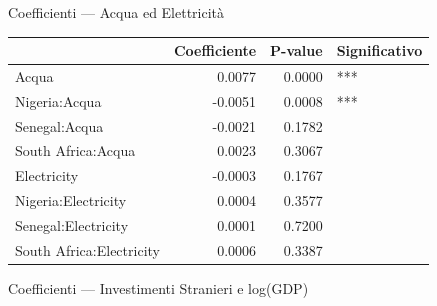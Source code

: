 \documentclass[
  ignorenonframetext,
  aspectratio=43,
]{beamer}
\begin{document}
\begin{frame}{Coefficienti --- Acqua ed Elettricità}
\protect{}\label{coefficienti-acqua-ed-elettricituxe0}
\begin{tabular}{lrrl}
\toprule
  & Coefficiente & P-value & Significativo\\
\midrule
Acqua & 0.0077 & 0.0000 & ***\\
Nigeria:Acqua & -0.0051 & 0.0008 & ***\\
Senegal:Acqua & -0.0021 & 0.1782 & \\
South Africa:Acqua & 0.0023 & 0.3067 & \\
Electricity & -0.0003 & 0.1767 & \\
\addlinespace
Nigeria:Electricity & 0.0004 & 0.3577 & \\
Senegal:Electricity & 0.0001 & 0.7200 & \\
South Africa:Electricity & 0.0006 & 0.3387 & \\
\bottomrule
\end{tabular}
\end{frame}

\begin{frame}{Coefficienti --- Investimenti Stranieri e log(GDP)}
\protect{}\label{coefficienti-investimenti-stranieri-e-loggdp}
\end{frame}
\end{document}

